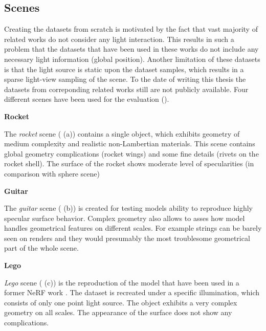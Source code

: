 \subsection{Scenes}

Creating the datasets from scratch is motivated by the fact that
vast majority of related works do not consider any light interaction.
This results in such a problem that the datasets that have been used in these works
do not include any necessary light information (global position).
Another limitation of these datasets is that the light source is static upon the dataset samples,
which results in a sparse light-view sampling of the scene.
To the date of writing this thesis the datasets from correponding related works \cite{nerv2021}
still are not publicly available.
Four different scenes have been used for the evaluation ().






\textbf{Rocket}

The \textit{rocket} scene ( (a)) contains a single object,
which exhibits geometry of medium complexity and realistic non-Lambertian materials.
This scene contains global geometry complications (rocket wings) and some fine details (rivets on the rocket shell).
The surface of the rocket shows moderate level of specularities (in comparison with sphere scene)

\textbf{Guitar}

The \textit{guitar} scene ( (b)) is created for testing models ability
to reproduce highly specular surface behavior.
Complex geometry also allows to asses how model handles geometrical features on different scales.
For example strings can be barely seen on renders and they would presumably the most troublesome geometrical part of the whole scene.

\textbf{Lego}

\textit{Lego} scene ( (c)) is the reproduction of the model
that have been used in a former NeRF work \cite{mildenhall2020nerf}.
The dataset is recreated under a specific illumination,
which consists of only one point light source.
The object exhibits a very complex geometry on all scales.
The appearance of the surface does not show any complications.

